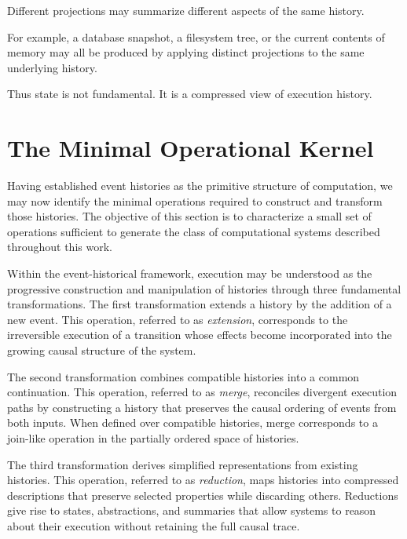 \documentclass[12pt]{article}
\begin{document}
Different projections may summarize different aspects
of the same history.

For example, a database snapshot, a filesystem tree,
or the current contents of memory may all be produced
by applying distinct projections to the same underlying history.

Thus state is not fundamental.
It is a compressed view of execution history.


\section{The Minimal Operational Kernel}

Having established event histories as the primitive
structure of computation, we may now identify the
minimal operations required to construct and transform
those histories. The objective of this section is to
characterize a small set of operations sufficient to
generate the class of computational systems described
throughout this work.

Within the event-historical framework, execution may
be understood as the progressive construction and
manipulation of histories through three fundamental
transformations. The first transformation extends a
history by the addition of a new event. This operation,
referred to as \emph{extension}, corresponds to the
irreversible execution of a transition whose effects
become incorporated into the growing causal structure
of the system.

The second transformation combines compatible histories
into a common continuation. This operation, referred to
as \emph{merge}, reconciles divergent execution paths
by constructing a history that preserves the causal
ordering of events from both inputs. When defined over
compatible histories, merge corresponds to a join-like
operation in the partially ordered space of histories.

The third transformation derives simplified
representations from existing histories. This operation,
referred to as \emph{reduction}, maps histories into
compressed descriptions that preserve selected
properties while discarding others. Reductions give
rise to states, abstractions, and summaries that allow
systems to reason about their execution without
retaining the full causal trace.
\end{document}
